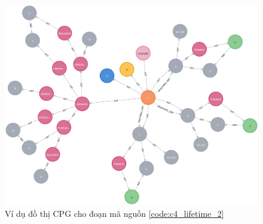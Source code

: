 \begin{figure}[H]
    \includegraphics[width=1\columnwidth]{figures/c4/c4_lifetime_2.png}
    \centering
    \caption{Ví dụ đồ thị CPG cho đoạn mã nguồn \ref{code:c4_lifetime_2}}
    \label{img:c4_lifetime_2}
\end{figure}
